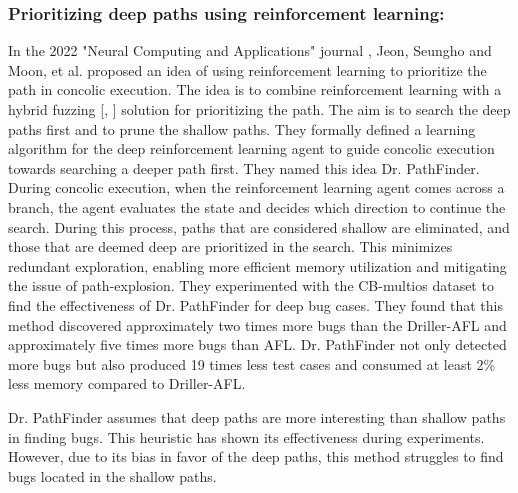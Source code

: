 \documentclass[ runningheads,
               a4paper]{llncs}
\begin{document}
\subsubsection{Prioritizing deep paths using reinforcement learning:}
In the 2022 "Neural Computing and Applications" journal \cite{drPathfinder2022}, Jeon, Seungho and Moon, et al. proposed an idea \cite[Dr. PathFinder]{drPathfinder2022} of using reinforcement learning to prioritize the path in concolic execution. The idea is to combine reinforcement learning with a hybrid fuzzing [\cite{miller1990empirical}, \cite{godefroid2012sage}] solution for prioritizing the path. The aim is to search the deep paths first and to prune the shallow paths. They formally defined a learning algorithm for the deep reinforcement learning agent to guide concolic execution towards searching a deeper path first. They named this idea Dr. PathFinder. During concolic execution, when the reinforcement learning agent comes across a branch, the agent evaluates the state and decides which direction to continue the search. During this process, paths that are considered shallow are eliminated, and those that are deemed deep are prioritized in the search. This minimizes redundant exploration, enabling more efficient memory utilization and mitigating the issue of path-explosion. They experimented with the CB-multios dataset to find the effectiveness of Dr. PathFinder for deep bug cases.  They found that this method discovered approximately two times more bugs than the Driller-AFL and approximately five times more bugs than AFL. Dr. PathFinder not only detected more bugs but also produced 19 times less test cases and consumed at least 2\% less memory compared to Driller-AFL.


Dr. PathFinder assumes that deep paths are more interesting than shallow paths in finding bugs. This heuristic has shown its effectiveness during experiments. However, due to its bias in favor of the deep paths, this method struggles to find bugs located in the shallow paths.


\end{document}
